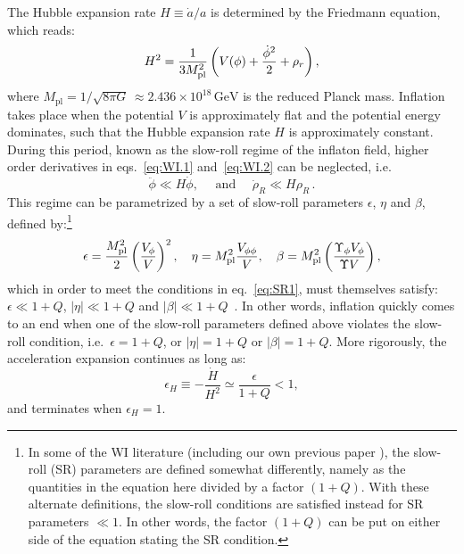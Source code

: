 \documentclass[a4paper,11pt]{article}
\begin{document}
The Hubble expansion rate $H\equiv \dot{a}/a$ is determined by the Friedmann equation, which reads:
\begin{equation}
    H^2=\frac{1}{3M^2_{\rm{pl}}}\left( V(\phi)+\frac{\dot{\phi}^2}{2}+\rho_r\right), \label{eq:WI.4}
\end{equation}
where $M_{\mathrm{pl}}= 1/\sqrt{8 \pi G} \, \approx 2.436\times 10^{18}\,\mathrm{GeV}$ is the reduced Planck mass.
Inflation takes place when the potential $V$ is approximately flat and the potential energy
dominates, such that the Hubble expansion rate $H$ is approximately constant. During this period, known as the slow-roll regime of the inflaton field, higher order derivatives in eqs.~\eqref{eq:WI.1} and~\eqref{eq:WI.2} can be neglected, i.e.
\begin{equation}
    \ddot{\phi} \ll H \dot{\phi}, \quad \text { and } \quad \dot{\rho}_{R} \ll H \rho_{R}\,. \label{eq:SR1}
\end{equation}
This regime can be parametrized by a set of slow-roll parameters $\epsilon$, $\eta$ and $\beta$,
defined by:\footnote{In some of the WI literature (including our own previous paper \cite{Montefalcone:2022jfw}), the slow-roll (SR) parameters are defined somewhat differently, namely as the quantities in the equation here divided by a factor $(1+Q)$. With these alternate definitions, the slow-roll conditions are satisfied instead for SR parameters $\ll1$. In other words, the factor $(1+Q)$ can be put on either side of the equation stating the SR condition.}
\begin{equation}
\epsilon=\frac{M^2_{\rm{pl}}}{2}\left(\frac{V_\phi}{V}\right)^2, \quad \eta=M^2_{\rm{pl}} \frac{V_{\phi \phi}}{V}, \quad \beta=M^2_{\rm{pl}}\left(\frac{\Upsilon_\phi V_\phi}{\Upsilon V}\right),
\end{equation}
which in order to meet the conditions in eq.~\eqref{eq:SR1}, must themselves satisfy: $\epsilon \ll 1+Q$, $|\eta| \ll 1+Q$ and $|\beta| \ll 1+Q$~\cite{Taylor:2000ze, Hall:2003zp, Bastero-Gil:2004oun, Moss:2008yb}. In other words, inflation quickly comes to an end when one of the slow-roll parameters defined above violates the slow-roll
condition, i.e.\ $\epsilon= 1+Q$, or $|\eta|=1+Q$ or $|\beta|=1+Q$.
More rigorously, the acceleration expansion continues as long as:
\begin{equation}
    \epsilon_H\equiv -\frac{\dot{H}}{H^2}\simeq \frac{\epsilon}{1+Q} <1, \label{eq:epsH}  
\end{equation}
and terminates when $\epsilon_H=1$.
\end{document}
